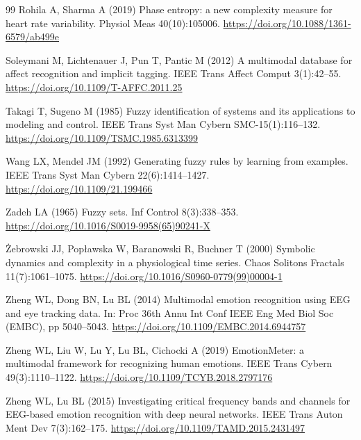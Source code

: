 \begin{thebibliography}{99}
 Rohila A, Sharma A (2019) Phase entropy: a new complexity measure for heart rate variability. Physiol Meas 40(10):105006. \url{https://doi.org/10.1088/1361-6579/ab499e}

 Soleymani M, Lichtenauer J, Pun T, Pantic M (2012) A multimodal database for affect recognition and implicit tagging. IEEE Trans Affect Comput 3(1):42--55. \url{https://doi.org/10.1109/T-AFFC.2011.25}

 Takagi T, Sugeno M (1985) Fuzzy identification of systems and its applications to modeling and control. IEEE Trans Syst Man Cybern SMC-15(1):116--132. \url{https://doi.org/10.1109/TSMC.1985.6313399}

 Wang LX, Mendel JM (1992) Generating fuzzy rules by learning from examples. IEEE Trans Syst Man Cybern 22(6):1414--1427. \url{https://doi.org/10.1109/21.199466}

 Zadeh LA (1965) Fuzzy sets. Inf Control 8(3):338--353. \url{https://doi.org/10.1016/S0019-9958(65)90241-X}

 \.Zebrowski JJ, Pop\l awska W, Baranowski R, Buchner T (2000) Symbolic dynamics and complexity in a physiological time series. Chaos Solitons Fractals 11(7):1061--1075. \url{https://doi.org/10.1016/S0960-0779(99)00004-1}

 Zheng WL, Dong BN, Lu BL (2014) Multimodal emotion recognition using EEG and eye tracking data. In: Proc 36th Annu Int Conf IEEE Eng Med Biol Soc (EMBC), pp 5040--5043. \url{https://doi.org/10.1109/EMBC.2014.6944757}

 Zheng WL, Liu W, Lu Y, Lu BL, Cichocki A (2019) EmotionMeter: a multimodal framework for recognizing human emotions. IEEE Trans Cybern 49(3):1110--1122. \url{https://doi.org/10.1109/TCYB.2018.2797176}

 Zheng WL, Lu BL (2015) Investigating critical frequency bands and channels for EEG-based emotion recognition with deep neural networks. IEEE Trans Auton Ment Dev 7(3):162--175. \url{https://doi.org/10.1109/TAMD.2015.2431497}

\end{thebibliography}
